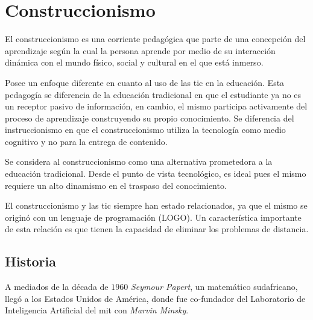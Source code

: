 \section{Construccionismo}
\label{sec:tics_CONSTRUCCIONISMO}

El construccionismo es una corriente pedagógica que parte de una concepción del
aprendizaje según la cual la persona aprende por medio de su interacción
dinámica con el mundo físico, social y cultural en el que está
inmerso\cite{valdivia:sg}.

Posee un enfoque diferente en cuanto al uso de las \Gls{tic} en la educación.
Esta pedagogía se diferencia de la educación tradicional en que el estudiante ya
no es un receptor pasivo de información, en cambio, el mismo participa
activamente del proceso de aprendizaje construyendo su propio conocimiento. Se
diferencia del instruccionismo en que el construccionismo utiliza la tecnología
como medio cognitivo y no para la entrega de contenido.

Se considera al construccionismo como una alternativa prometedora a la educación
tradicional. Desde el punto de vista tecnológico, es ideal pues el mismo
requiere un alto dinamismo en el traspaso del
conocimiento\cite{sasha:construtivism}. 

El construccionismo y las \Gls{tic} siempre han estado relacionados, ya que el
mismo se originó con un lenguaje de programación (LOGO)\cite{ict:ttc}. Un
característica importante de esta relación es que tienen la capacidad de
eliminar los problemas de distancia\cite{mariluz:seiousgames}.


\subsection{Historia}

A mediados de la década de $1960$ \textit{Seymour Papert}, un matemático
sudafricano, llegó a los Estados Unidos de América, donde fue co-fundador del
Laboratorio de Inteligencia Artificial del \Gls{mit} con \textit{Marvin
    Minsky}\cite{logo:sg}. 


